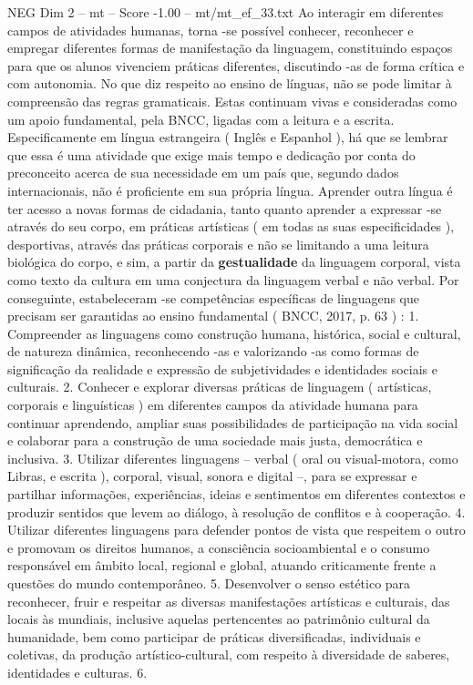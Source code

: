 \begin{textsample}{NEG Dim 2 – mt – Score -1.00 – mt/mt\_ef\_33.txt}
Ao interagir em diferentes campos de atividades humanas, torna -se possível conhecer, reconhecer e empregar diferentes formas de manifestação da linguagem, constituindo espaços para que os alunos vivenciem práticas diferentes, discutindo -as de forma crítica e com autonomia.
No que diz respeito ao ensino de línguas, não se pode limitar à compreensão das regras gramaticais.
Estas continuam vivas e consideradas como um apoio fundamental, pela BNCC, ligadas com a leitura e a escrita.
Especificamente em língua estrangeira ( Inglês e Espanhol ), há que se lembrar que essa é uma atividade que exige mais tempo e dedicação por conta do preconceito acerca de sua necessidade em um país que, segundo dados internacionais, não é proficiente em sua própria língua.
Aprender outra língua é ter acesso a novas formas de cidadania, tanto quanto aprender a expressar -se através do seu corpo, em práticas artísticas ( em todas as suas especificidades ), desportivas, através das práticas corporais e não se limitando a uma leitura biológica do corpo, e sim, a partir da \textbf{gestualidade} da linguagem corporal, vista como texto da cultura em uma conjectura da linguagem verbal e não verbal.
Por conseguinte, estabeleceram -se competências específicas de linguagens que precisam ser garantidas ao ensino fundamental ( BNCC, 2017, p. 63 ) : 1.
Compreender as linguagens como construção humana, histórica, social e cultural, de natureza dinâmica, reconhecendo -as e valorizando -as como formas de significação da realidade e expressão de subjetividades e identidades sociais e culturais. 2.
Conhecer e explorar diversas práticas de linguagem ( artísticas, corporais e linguísticas ) em diferentes campos da atividade humana para continuar aprendendo, ampliar suas possibilidades de participação na vida social e colaborar para a construção de uma sociedade mais justa, democrática e inclusiva. 3.
Utilizar diferentes linguagens – verbal ( oral ou visual-motora, como Libras, e escrita ), corporal, visual, sonora e digital –, para se expressar e partilhar informações, experiências, ideias e sentimentos em diferentes contextos e produzir sentidos que levem ao diálogo, à resolução de conflitos e à cooperação. 4.
Utilizar diferentes linguagens para defender pontos de vista que respeitem o outro e promovam os direitos humanos, a consciência socioambiental e o consumo responsável em âmbito local, regional e global, atuando criticamente frente a questões do mundo contemporâneo. 5.
Desenvolver o senso estético para reconhecer, fruir e respeitar as diversas manifestações artísticas e culturais, das locais às mundiais, inclusive aquelas pertencentes ao patrimônio cultural da humanidade, bem como participar de práticas diversificadas, individuais e coletivas, da produção artístico-cultural, com respeito à diversidade de saberes, identidades e culturas. 6.

\end{textsample}
